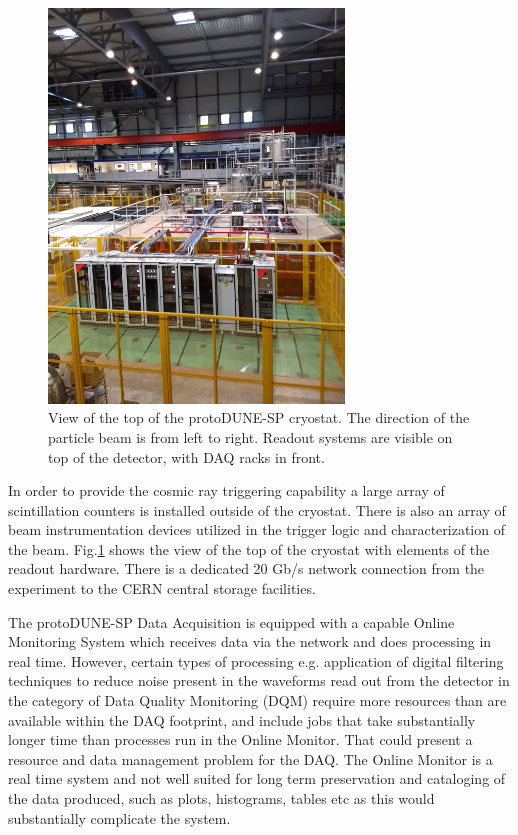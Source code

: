 \documentclass{webofc}
\newcommand{\pd}{protoDUNE\xspace}
\begin{document}
\begin{figure}[tb]
\centering\includegraphics[width=0.7\textwidth]{figures/np04_photo_2018_v1.png}
\caption{\label{fig:np04_photo}View of the top of the \pd-SP cryostat. The direction of the particle beam is from left to right.
Readout systems are visible on top of the detector, with DAQ racks in front.}
\end{figure}


In order to provide the cosmic ray triggering capability a large array of scintillation
counters is installed outside of the cryostat. There is also an array of beam instrumentation devices
utilized in the  trigger logic and characterization of the beam. Fig.\ref{fig:np04_photo}
shows the view of the top of the cryostat with elements of the readout hardware.
There is a dedicated 20 Gb/s network connection from the experiment to the CERN central storage facilities.

The \pd-SP Data Acquisition is equipped with a capable Online Monitoring System which receives data via
the network and does processing in real time. However, certain types of processing e.g. application of
digital filtering techniques to reduce noise present in the waveforms read out from the detector
in the category of Data Quality Monitoring (DQM) require more resources than are available within
the DAQ footprint, and include jobs that take substantially longer time than processes run in the
Online Monitor. That could present a resource and data management problem for the DAQ.
The Online Monitor is a real time system
and not well suited for long term preservation and cataloging of the data produced, such as plots,
histograms, tables etc as this would substantially complicate the system.
\end{document}
